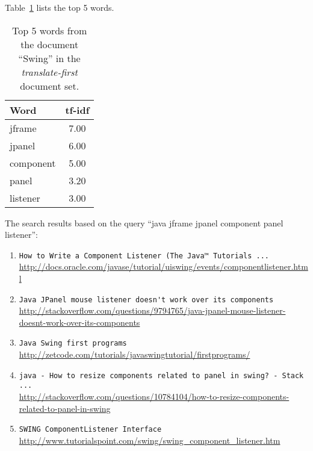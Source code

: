 Table~\ref{tab:topWords-en-swing-2} lists the top 5 words.
\begin{table}[H]
\centering
\begin{tabular}{|l|c|}
\hline\hline
    Word & tf-idf \\
\hline
    jframe & 7.00 \\
    jpanel & 6.00 \\
    component & 5.00 \\
    panel & 3.20 \\
    listener & 3.00 \\
\hline\hline
\end{tabular}
\caption{Top 5 words from the document ``Swing'' in the \textit{translate-first} document set.}
\label{tab:topWords-en-swing-2}
\end{table}

The search results based on the query ``java jframe jpanel component panel listener'':

\begin{enumerate}
\item
    \verb|How to Write a Component Listener (The Java™ Tutorials ...| \\
    \url{http://docs.oracle.com/javase/tutorial/uiswing/events/componentlistener.html}
\item
    \verb|Java JPanel mouse listener doesn't work over its components| \\
    \url{http://stackoverflow.com/questions/9794765/java-jpanel-mouse-listener-doesnt-work-over-its-components}
\item
    \verb|Java Swing first programs| \\
    \url{http://zetcode.com/tutorials/javaswingtutorial/firstprograms/}
\item
    \verb|java - How to resize components related to panel in swing? - Stack ...| \\
    \url{http://stackoverflow.com/questions/10784104/how-to-resize-components-related-to-panel-in-swing}
\item
    \verb|SWING ComponentListener Interface| \\
    \url{http://www.tutorialspoint.com/swing/swing_component_listener.htm}
\end{enumerate}

